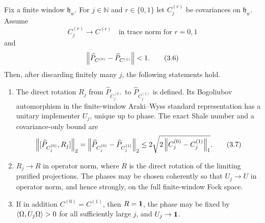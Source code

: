 \begin{theorem}\label{thm:local}
Fix a finite window $\mathfrak h_w$.  For $j\in\mathbb N$ and
$r\in\{0,1\}$ let $C_j^{(r)}$ be covariances on $\mathfrak h_w$.
Assume
\[
 C_j^{(r)}\longrightarrow C^{(r)}
 \quad\text{in trace norm for }r=0,1
\tag{3.5}\label{eq:trace-conv}
\]
and
\[
 \left\lVert \widehat P_{C^{(0)}}-\widehat P_{C^{(1)}}\right\rVert<1.
\tag{3.6}\label{eq:angle}
\]
Then, after discarding finitely many $j$, the following statements hold.

\begin{enumerate}[label=\textup{(\alph*)}]
\item The direct rotation $R_j$ from
  $\widehat P_{C_j^{(0)}}$ to $\widehat P_{C_j^{(1)}}$ is defined.
  Its Bogoliubov automorphism in the finite-window Araki--Wyss standard
  representation has a unitary implementer $U_j$, unique up to phase.
  The exact Shale number and a covariance-only bound are
  \[
  \left\lVert [\widehat P_{C_j^{(0)}},R_j]\right\rVert_2
  =\left\lVert \widehat P_{C_j^{(0)}}-\widehat P_{C_j^{(1)}}\right\rVert_2
  \le2\sqrt{2\left\lVert C_j^{(0)}-C_j^{(1)}\right\rVert_1}.
  \tag{3.7}\label{eq:local-shale}
  \]
\item $R_j\to R$ in operator norm, where $R$ is the direct rotation
  of the limiting purified projections.  The phases may be chosen
  coherently so that $U_j\to U$ in operator norm, and hence strongly,
  on the full finite-window Fock space.
\item If in addition $C^{(0)}=C^{(1)}$, then $R=\mathbf 1$, the phase may be
  fixed by $\left\langle \Omega,U_j\Omega\right\rangle>0$ for all sufficiently large $j$,
  and $U_j\to\mathbf 1$.
\end{enumerate}
\end{theorem}

